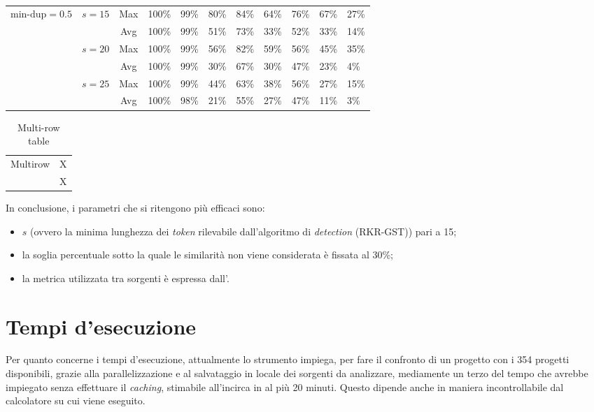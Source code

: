 \begin{landscape}
\begin{table}[h!]
\begin{tabular}{ c|c|c|p{1.5cm}|p{1.5cm}|p{1.5cm}|p{1.5cm}|p{1.5cm}|p{1.5cm}|p{1.5cm}|p{1.5cm} }
            \multirow{6}{*}{$\text{min-dup}=0.5$} & \multirow{2}{*}{$s=15$} & Max & 100\% & 99\% & 80\% & 84\% & 64\% & 76\% & 67\% & 27\% \\
            & & Avg & 100\% & 99\% & 51\% & 73\% & 33\% & 52\% & 33\% & 14\% \\
            & \multirow{2}{*}{$s=20$} & Max & 100\% & 99\% & 56\% & 82\% & 59\% & 56\% & 45\% & 35\% \\
            & & Avg & 100\% & 99\% & 30\% & 67\% & 30\% & 47\% & 23\% & 4\% \\
            & \multirow{2}{*}{$s=25$} & Max & 100\% & 99\% & 44\% & 63\% & 38\% & 56\% & 27\% & 15\% \\
            & & Avg & 100\% & 98\% & 21\% & 55\% & 27\% & 47\% & 11\% & 3\% \\
            \hline
        \end{tabular}
        \caption[]{}
        \label{table:grid-search}
    \end{table}
\end{landscape}

\begin{table}[ht]
    \caption{Multi-row table}
    \begin{center}
    \begin{tabular}{cc}
        \hline
        \multirow{2}{*}{Multirow}&X\\
        &X\\
        \hline
    \end{tabular}
    \end{center}
    \label{tab:multicol}
    \end{table}





In conclusione, i parametri che si ritengono più efficaci sono: 

\begin{itemize}
    \item $s$ (ovvero la minima lunghezza dei \textit{token} rilevabile dall'algoritmo di \textit{detection} (RKR-GST)) pari a 15;
    \item la soglia percentuale sotto la quale le similarità non viene considerata è fissata al 30\%;
    \item la metrica utilizzata tra sorgenti è espressa dall'.
\end{itemize}

\section{Tempi d'esecuzione}
Per quanto concerne i tempi d'esecuzione, attualmente lo strumento impiega, per fare il confronto di un progetto con i 354 progetti disponibili, grazie alla parallelizzazione e al salvataggio in locale dei sorgenti da analizzare, mediamente un terzo del tempo che avrebbe impiegato senza effettuare il \textit{caching}, stimabile all'incirca in al più 20 minuti.
%
Questo dipende anche in maniera incontrollabile dal calcolatore su cui viene eseguito.

